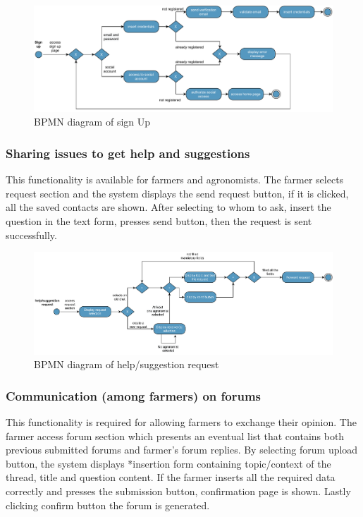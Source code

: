 \begin{figure}[H]
	\centering
    \includegraphics[width=\textwidth]{Images/BPMN/signup.pdf}
	\caption{\label{fig:bpmn_sign_up}BPMN diagram of sign Up}
\end{figure}


\subsubsection{Sharing issues to get help and suggestions}
This functionality is available for farmers and agronomists. The farmer selects request 
section and the system displays the send request button, if it is clicked, all the saved 
contacts are shown. After selecting to whom to ask, insert the question in the text form,
presses send button, then the request is sent successfully.

\begin{figure}[H]
	\centering
    \includegraphics[width=\textwidth]{Images/BPMN/help-suggestion-request.pdf}
	\caption{\label{fig:bpmn_request}BPMN diagram of help/suggestion request}
\end{figure}

\subsubsection{Communication (among farmers) on forums}
This functionality is required for allowing farmers to exchange their opinion. The farmer 
access forum section which presents an eventual list that contains both previous submitted 
forums and farmer’s forum replies. By selecting forum upload button, the system displays 
*insertion form containing topic/context of the thread, title and question content. If the farmer 
inserts all the required data correctly and presses the submission button, confirmation page 
is shown. Lastly clicking confirm button the forum is generated. 

